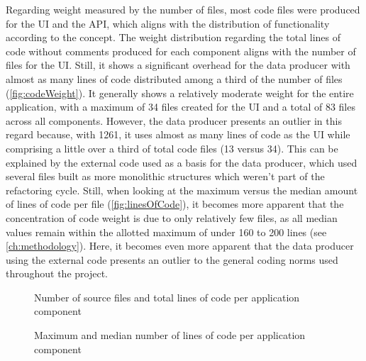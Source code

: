 Regarding weight measured by the number of files, most code files were produced for the \ac{UI} and the \ac{API}, which aligns with the distribution of functionality according to the concept.
The weight distribution regarding the total lines of code without comments produced for each component aligns with the number of files for the \ac{UI}.
Still, it shows a significant overhead for the data producer with almost as many lines of code distributed among a third of the number of files (\autoref{fig:codeWeight}).
It generally shows a relatively moderate weight for the entire application, with a maximum of 34 files created for the \ac{UI} and a total of 83 files across all components.
However, the data producer presents an outlier in this regard because, with 1261, it uses almost as many lines of code as the  \ac{UI} while comprising a little over a third of total code files (13 versus 34).
This can be explained by the external code used as a basis for the data producer, which used several files built as more monolithic structures which weren't part of the refactoring cycle.
Still, when looking at the maximum versus the median amount of lines of code per file (\autoref{fig:linesOfCode}), it becomes more apparent that the concentration of code weight is due to only relatively few files, as all median values remain within the allotted maximum of under 160 to 200 lines (see \autoref{ch:methodology}).
Here, it becomes even more apparent that the data producer using the external code presents an outlier to the general coding norms used throughout the project.

\begin{figure*}[!ht]
\hfill

\caption[Source file count and total lines of code]{Number of source files and total lines of code per application component\protect}
\label{fig:codeWeight}
\end{figure*}

\begin{figure}[!ht]
\centering

\caption[Lines of code per application component]{Maximum and median number of lines of code per application component\protect}
\label{fig:linesOfCode}
\end{figure}

